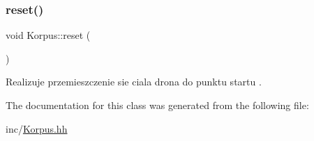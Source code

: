 \subsubsection{\texorpdfstring{reset()}{reset()}}
{\footnotesize\ttfamily void Korpus\+::reset (\begin{DoxyParamCaption}{ }\end{DoxyParamCaption})\hspace{0.3cm}{\ttfamily [inline]}}

Realizuje przemieszczenie sie ciala drona do punktu startu . 

The documentation for this class was generated from the following file\+:\begin{DoxyCompactItemize}
\item 
inc/\mbox{\hyperlink{_korpus_8hh}{Korpus.\+hh}}\end{DoxyCompactItemize}
